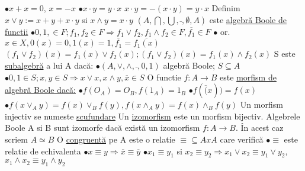 \documentclass[twocolumn]{article}
\begin{document}
	$\bullet x + x = 0$, $x = -x$ \newline
	$\bullet x \cdot y = y \cdot x$ \newline
	$x \cdot y = - (x \cdot y) = y \cdot x$ \newline
	Definim $x \vee y := x + y + x \cdot y$ si $x \wedge y = x \cdot y$ \newline
	$(A, \bigcap, \bigcup, \bar{ }, \emptyset, A)$ este \underline{algebră Boole de functii} \newline
	$\bullet 0, 1, \in F; f_{1}, f_{2} \in F \Rightarrow f_{1} \vee f_{2}, f_{1} \wedge f_{2} \in F, \overline{f_{1}} \in F$ \newline
	$\bullet$ or. $x \in X, 0(x) = 0, 1(x) = 1, \overline{f_{1}} = \overline{f_{1}(x)}$ \newline
	$(f_{1} \vee f_{2})(x) = f_{1}(x) \vee f_{2}(x); (f_{1} \vee f_{2})(x) = f_{1}(x) \wedge f_{2}(x)$ \newline
	S este \underline{subalgebră} a lui A dacă: \newline
	$\bullet (A, \vee, \wedge, \bar{ }, 0, 1)$ algebră Boole; $S \subseteq A$ \newline
	$\bullet 0, 1 \in S; x, y \in S \Rightarrow x \vee x, x \wedge y, \overline{x} \in S$ \newline
	O functie $f: A \rightarrow B$ este \underline{morfism de algebră Boole dacă:}
	$\bullet f(O_{A}) = O_{B}, f(1_{A}) = 1_{B}$ \newline
	$\bullet f(\overline(x)) = f(x)$ \newline
	$\bullet f(x \vee _{A} y) = f(x) \vee _{B} f(y), f(x \wedge _{A} y) = f(x) \wedge _{B} f(y)$ \newline
	Un morfism injectiv se numeste \underline{scufundare} \newline
	Un \underline{izomorfism} este un morfism bijectiv. \newline
	Algebrele Boole A si B sunt izomorfe dacă există un izomorfism $f: A \rightarrow B$. În acest caz scriem $A \simeq B$ \newline
	O \underline{congruentă} pe A este o relatie $\equiv \subseteq A x A$ care verifică \newline
	$\bullet \equiv$ este relatie de echivalenta \newline
	$\bullet x \equiv y \Rightarrow \overline{x} \equiv \overline{y}$ \newline
	$\bullet x_{1} \equiv y_{1}$ si $x_{2} \equiv y_{2} \Rightarrow x_{1} \vee x_{2} \equiv y_{1} \vee y_{2}$, $x_{1} \wedge x_{2} \equiv y_{1} \wedge y_{2}$ \newline
	\newline
	
\end{document}
